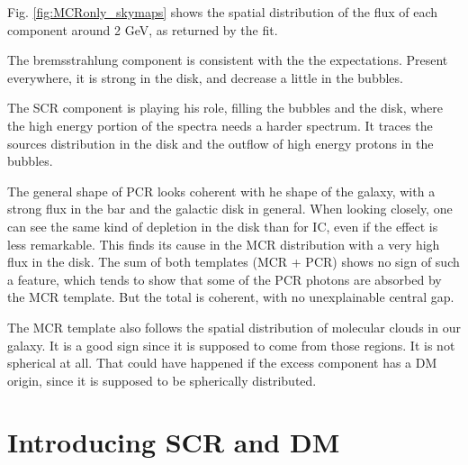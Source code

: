 Fig. \ref{fig:MCRonly_skymaps} shows the spatial distribution of the flux of each component around 2 GeV, as returned by the fit.

The bremsstrahlung component is consistent with the the expectations. Present everywhere, it is strong in the disk, and decrease a little in the bubbles.


The SCR component is playing his role, filling the bubbles and the disk, where the high energy portion of the spectra needs a harder spectrum. It traces the sources distribution in the disk and the outflow of high energy protons in the bubbles.

The general shape of PCR looks coherent with he shape of the galaxy, with a strong flux in the bar and the galactic disk in general. When looking closely, one can see the same kind of depletion in the disk than for IC, even if the effect is less remarkable. This finds its cause in the MCR distribution with a very high flux in the disk. The sum of both templates (MCR + PCR) shows no sign of such a feature, which tends to show that some of the PCR photons are absorbed by the MCR template. But the total is coherent, with no unexplainable central gap.

The MCR template also follows the spatial distribution of molecular clouds in our galaxy. It is a good sign since it is supposed to come from those regions.
It is not spherical at all. That could have happened if the excess component has a DM origin, since it is supposed to be spherically distributed.


\section{Introducing SCR and DM}

